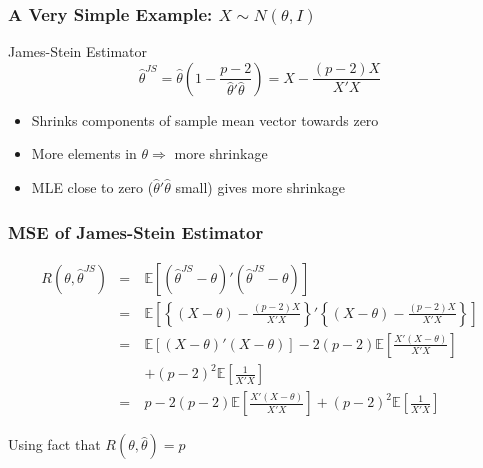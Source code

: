 \begin{frame}
  \frametitle{A Very Simple Example: $X \sim N(\theta, I)$}

  \begin{block}{James-Stein Estimator}
\begin{equation*}
  \hat{\theta}^{JS} = \hat{\theta}\left( 1 - \frac{p-2}{\hat{\theta}'\hat{\theta}} \right) = X - \frac{\left( p-2 \right)X}{X'X}
\end{equation*}
\begin{itemize}
  \item Shrinks components of sample mean vector towards zero
  \item More elements in $\theta \Rightarrow$ more shrinkage 
  \item MLE close to zero ($\widehat{\theta}'\widehat{\theta}$ small)    gives more shrinkage
\end{itemize}
  \end{block}
\end{frame}
\begin{frame}
  \frametitle{MSE of James-Stein Estimator}
  \small
\begin{eqnarray*}
  R\left(\theta, \hat{\theta}^{JS} \right) &=& \mathbb{E}\left[ \left( \hat{\theta}^{JS} - \theta \right)'\left( \hat{\theta}^{JS} - \theta \right) \right]\\
  &=& \mathbb{E}\left[ \left\{ \left( X - \theta \right) - \frac{(p-2)X}{X'X} \right\}' \left\{ \left( X - \theta \right) - \frac{(p-2)X}{X'X} \right\} \right]  \\
  &=&\mathbb{E}\left[ \left( X - \theta \right)'\left( X - \theta \right) \right] - 2 (p-2)\mathbb{E}\left[ \frac{X'(X-\theta)}{X'X} \right]\\
  &\quad& +\left( p-2 \right)^{2} \mathbb{E}\left[ \frac{1}{X'X} \right] \\
  &=& p - 2 (p-2)\mathbb{E}\left[ \frac{X'(X-\theta)}{X'X} \right] + \left( p-2 \right)^{2} \mathbb{E}\left[ \frac{1}{X'X} \right]
\end{eqnarray*}

Using fact that $R(\theta,\widehat{\theta})=p$ 
\end{frame}
